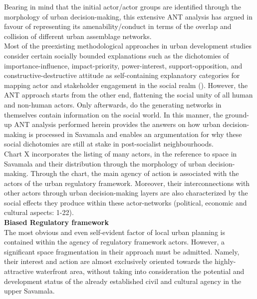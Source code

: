 \documentclass[11pt]{report}
\begin{document}
Bearing in mind that the initial actor/actor groups are identified through the morphology of urban decision-making, this extensive ANT analysis has argued in favour of representing its amenability/conduct in terms of the overlap and collision of different urban assemblage networks.
\\

Most of the preexisting methodological approaches in urban development studies consider certain socially bounded explanations such as the dichotomies of importance-influence, impact-priority, power-interest, support-opposition, and constructive-destructive attitude as self-containing explanatory categories for mapping actor and stakeholder engagement in the social realm (\href{Mathur}{\citealt{mathur_defining_2007}}).
However, the ANT approach starts from the other end, flattening the social unity of all human and non-human actors. Only afterwards, do the generating networks in themselves contain information on the social world. In this manner, the ground-up ANT analysis performed herein provides the answers on how urban decision-making is processed in Savamala and enables an argumentation for why these social dichotomies are still at stake in post-socialist neighbourhoods.
\\

Chart X %
incorporates the listing of many actors, in the reference to space in Savamala and their distribution through the morphology of urban decision-making.
Through the chart, the main agency of action is associated with the actors of the urban regulatory framework.
Moreover, their interconnections  with other actors through urban decision-making layers are also characterized by the social effects they produce within these actor-networks (political, economic and cultural aspects: 1-22).
\\

\textbf{Biased Regulatory framework}
\\
The most obvious and even self-evident factor of local urban planning is contained within the agency of regulatory framework actors.
However, a significant space fragmentation in their approach must be admitted. Namely, their interest and action are almost exclusively oriented towards the highly-attractive waterfront area, without taking into consideration the potential and development status of the already established civil and cultural agency in the upper Savamala.
\\
\end{document}
